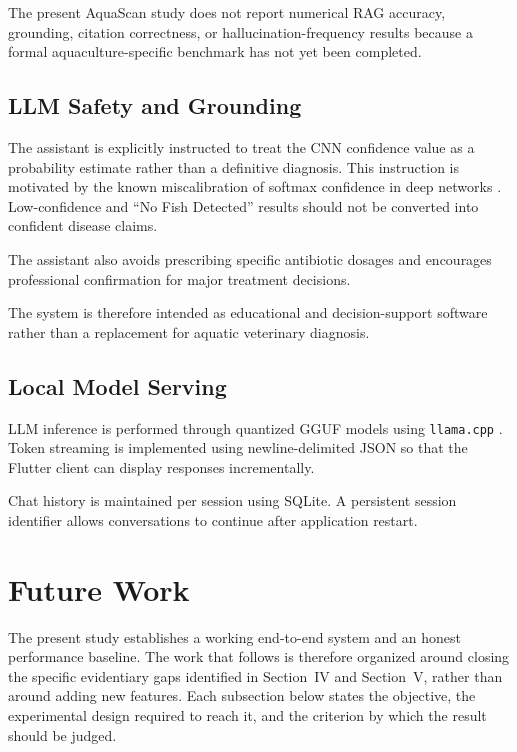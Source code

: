 \documentclass[conference]{IEEEtran}
\begin{document}
The present AquaScan study does not report numerical RAG accuracy, grounding, citation correctness, or hallucination-frequency results because a formal aquaculture-specific benchmark has not yet been completed.

\subsection{LLM Safety and Grounding}

The assistant is explicitly instructed to treat the CNN confidence value as a probability estimate rather than a definitive diagnosis. This instruction is motivated by the known miscalibration of softmax confidence in deep networks \cite{b23}. Low-confidence and ``No Fish Detected'' results should not be converted into confident disease claims.

The assistant also avoids prescribing specific antibiotic dosages and encourages professional confirmation for major treatment decisions.

The system is therefore intended as educational and decision-support software rather than a replacement for aquatic veterinary diagnosis.

\subsection{Local Model Serving}

LLM inference is performed through quantized GGUF models using \texttt{llama.cpp} \cite{b13}. Token streaming is implemented using newline-delimited JSON so that the Flutter client \cite{b14} can display responses incrementally.

Chat history is maintained per session using SQLite. A persistent session identifier allows conversations to continue after application restart.



\section{Future Work}

The present study establishes a working end-to-end system and an honest performance baseline. The work that follows is therefore organized around closing the specific evidentiary gaps identified in Section~IV and Section~V, rather than around adding new features. Each subsection below states the objective, the experimental design required to reach it, and the criterion by which the result should be judged.
\end{document}
